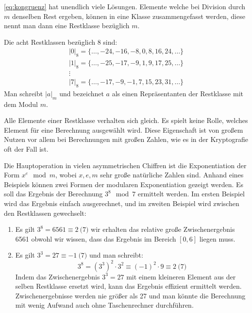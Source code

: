 \noindent
\autoref{eq:kongruenz} hat unendlich viele Lösungen.
Elemente welche bei Division durch $m$ denselben Rest ergeben,
können in eine Klasse zusammengefasst werden, diese nennt man dann eine Restklasse bezüglich $m$.
\begin{example}
  Die acht Restklassen bezüglich 8 sind:
  \begin{gather*}
    \vert0\vert_8 = \{\dots,-24,-16,-8,0,8,16,24,\dots\}\\
    \vert1\vert_8 =\{\dots,-25,-17,-9,1,9,17,25,\dots\}\\
    \vdots\\
    \vert7\vert_8 =\{\dots,-17,-9,-1,7,15,23,31,\dots\}
  \end{gather*}
  Man schreibt $|a|_m$ und bezeichnet $a$ als einen
  Repräsentanten der Restklasse mit dem Modul $m$.
\end{example}

\noindent
Alle Elemente einer Restklasse verhalten sich gleich. Es spielt
keine Rolle, welches Element für eine Berechnung ausgewählt wird.
Diese Eigenschaft ist von großem Nutzen vor allem bei Berechnungen mit großen Zahlen,
wie es in der Kryptografie oft der Fall ist.

\begin{example}
  Die Hauptoperation in vielen asymmetrischen Chiffren ist die Exponentiation der Form
  $x^e \mod{m}$, wobei $x,e,m$ sehr große natürliche Zahlen sind. Anhand eines Beispiels können
  zwei Formen der modularen Exponentiation gezeigt werden. Es soll das Ergebnis der
  Berechnung $3^8 \mod{7}$ ermittelt werden. Im ersten Beispiel wird das Ergebnis einfach
  ausgerechnet, und im zweiten Beispiel wird zwischen den Restklassen gewechselt:
  \begin{enumerate}
    \item Es gilt $3^8 = 6561 \equiv 2 \pod{7}$ wir erhalten das relative
          große Zwischenergebnis 6561 obwohl wir wissen,
          dass das Ergebnis im Bereich $[0, 6]$ liegen muss.
    \item Es gilt $3^3 = 27 \equiv -1 \pod{7}$ und man schreibt:
          \begin{equation*}
            3^8 = (3^3)^2 \cdot 3^2 \equiv (-1)^2 \cdot 9 \equiv 2 \pod{7}
          \end{equation*}
          Indem das Zwischenergebnis $3^3 = 27$ mit einem kleineren Element aus der selben
          Restklasse ersetzt wird, kann das Ergebnis effizient ermittelt werden. Zwischenergebnisse
          werden nie größer als 27 und man könnte die Berechnung mit wenig Aufwand auch ohne
          Taschenrechner durchführen. \qedhere
  \end{enumerate}
\end{example}

